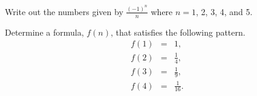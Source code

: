 
\begin{problem}
  \item Write out the numbers given by $\frac{(-1)^n}{n}$ where $n=1$,
    2, 3, 4, and 5.
    \vfill
  \item Determine a formula, $f(n)$, that satisfies the following
    pattern.
    \begin{eqnarray*}
      f(1) & = & 1, \\
      f(2) & = & \frac{1}{4}, \\
      f(3) & = & \frac{1}{9}, \\
      f(4) & = & \frac{1}{16}.
    \end{eqnarray*}
    \vfill
\end{problem}



